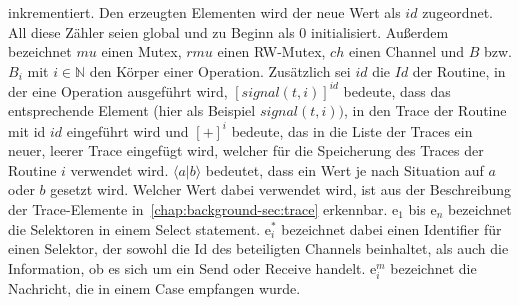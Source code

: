 inkrementiert. Den erzeugten Elementen wird der neue Wert als $id$ zugeordnet. All diese 
Zähler seien global und zu Beginn als $0$ initialisiert. Außerdem bezeichnet 
$mu$ einen Mutex, $rmu$ einen RW-Mutex, $ch$ einen Channel und $B$ bzw. $B_i$
mit $i\in\mathbb{N}$ den 
Körper einer Operation. Zusätzlich
sei $id$ die $Id$ der Routine, in der eine Operation ausgeführt wird,
$[signal(t, i)]^{id}$ bedeute, dass das entsprechende Element (hier als 
Beispiel $signal(t, i))$, in den Trace der Routine mit id $id$ eingeführt wird
und $[+]^i$ bedeute, das in die Liste der Traces ein neuer, leerer Trace 
eingefügt wird, welcher für die Speicherung des Traces der Routine $i$ 
verwendet wird. 
$\langle a|b\rangle$ bedeutet, dass ein Wert je nach Situation auf $a$ oder $b$ gesetzt 
wird. Welcher Wert dabei verwendet wird, ist aus der Beschreibung der 
Trace-Elemente in~\ref{chap:background-sec:trace} erkennbar. 
$\text{e}_1$ bis $\text{e}_n$ bezeichnet die Selektoren in einem Select statement.
$\text{e}_i^*$ bezeichnet dabei einen Identifier für einen Selektor, der sowohl die 
Id des beteiligten Channels beinhaltet, als auch die Information, ob es sich um ein 
Send oder Receive handelt. $\text{e}_i^m$ bezeichnet die Nachricht, die in einem Case 
empfangen wurde. 
